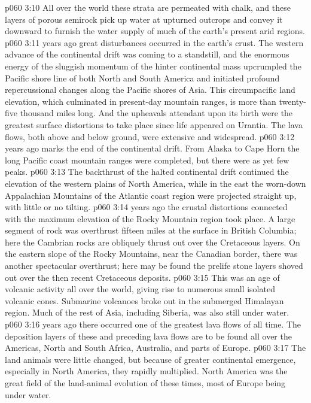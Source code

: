 \vs p060 3:10 All over the world these strata are permeated with chalk, and these layers of porous semirock pick up water at upturned outcrops and convey it downward to furnish the water supply of much of the earth’s present arid regions.
\vs p060 3:11 \pc {} years ago great disturbances occurred in the earth’s crust. The western advance of the continental drift was coming to a standstill, and the enormous energy of the sluggish momentum of the hinter continental mass upcrumpled the Pacific shore line of both North and South America and initiated profound repercussional changes along the Pacific shores of Asia. This circumpacific land elevation, which culminated in present\hyp{}day mountain ranges, is more than twenty\hyp{}five thousand miles long. And the upheavals attendant upon its birth were the greatest surface distortions to take place since life appeared on Urantia. The lava flows, both above and below ground, were extensive and widespread.
\vs p060 3:12 \pc {} years ago marks the end of the continental drift. From Alaska to Cape Horn the long Pacific coast mountain ranges were completed, but there were as yet few peaks.
\vs p060 3:13 The backthrust of the halted continental drift continued the elevation of the western plains of North America, while in the east the worn\hyp{}down Appalachian Mountains of the Atlantic coast region were projected straight up, with little or no tilting.
\vs p060 3:14 \pc {} years ago the crustal distortions connected with the maximum elevation of the Rocky Mountain region took place. A large segment of rock was overthrust fifteen miles at the surface in British Columbia; here the Cambrian rocks are obliquely thrust out over the Cretaceous layers. On the eastern slope of the Rocky Mountains, near the Canadian border, there was another spectacular overthrust; here may be found the prelife stone layers shoved out over the then recent Cretaceous deposits.
\vs p060 3:15 This was an age of volcanic activity all over the world, giving rise to numerous small isolated volcanic cones. Submarine volcanoes broke out in the submerged Himalayan region. Much of the rest of Asia, including Siberia, was also still under water.
\vs p060 3:16 \pc {} years ago there occurred one of the greatest lava flows of all time. The deposition layers of these and preceding lava flows are to be found all over the Americas, North and South Africa, Australia, and parts of Europe.
\vs p060 3:17 The land animals were little changed, but because of greater continental emergence, especially in North America, they rapidly multiplied. North America was the great field of the land\hyp{}animal evolution of these times, most of Europe being under water.
